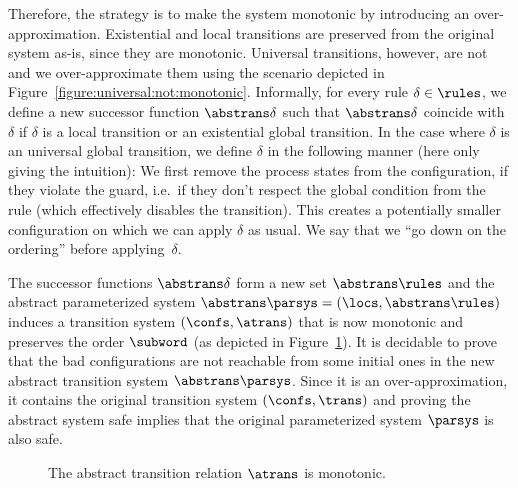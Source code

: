 %
%
%
Therefore, the strategy is to make the system monotonic by introducing
an over-approximation.
Existential and local transitions are preserved from the original
system as-is, since they are monotonic.
%
Universal transitions, however, are not and we over-approximate them
using the scenario depicted in
Figure~\ref{figure:universal:not:monotonic}.
%
Informally, for every rule $\delta\in\rules$, we define a new
successor function $\abstrans\delta$ such that $\abstrans\delta$
coincide with $\delta$ if $\delta$ is a local transition or an
existential global transition. In the case where $\delta$ is an
universal global transition, %
we define $\delta$ in the following manner (here only giving the
intuition):
%
We first remove the process states from the configuration, if they
violate the guard, i.e.\ if they don't respect the global condition
from the rule (which effectively disables the transition).
%
This creates a potentially smaller configuration on which we can apply
$\delta$ as usual. We say that we ``go down on the ordering'' before
applying~$\delta$.

The successor functions $\abstrans\delta$ form a new set
$\abstrans\rules$ and the abstract parameterized system %
$\abstrans\parsys = (\locs,\abstrans\rules)$ induces a transition
system $(\confs,\atrans)$ that is now monotonic and preserves the
order $\subword$ (as depicted in
Figure~\ref{figure:abstract:monotonic}).
%
It is decidable to prove that the bad configurations are not reachable
from some initial ones in the new abstract transition system
$\abstrans\parsys$. Since it is an over-approximation, it contains the
original transition system $(\confs,\trans)$ and proving the abstract
system safe implies that the original parameterized system $\parsys$
is also safe.

\begingroup%
\setlength\intextsep{\dazintextsep}
\begin{figure}[b]
  \smallskip
  \centering
  \caption{The abstract transition relation $\atrans$ is monotonic.}
  \label{figure:abstract:monotonic}
\end{figure}
\endgroup
